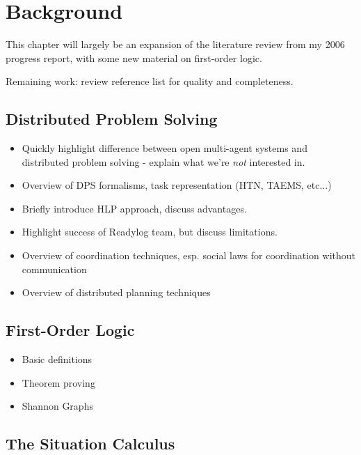 \chapter{Background}\label{ch:lit-review}

This chapter will largely be an expansion of the literature review from my 2006 progress report, with some new material on first-order logic.

Remaining work: review reference list for quality and completeness.

\section{Distributed Problem Solving}

\begin{itemize}
\item Quickly highlight difference between open multi-agent systems and
distributed problem solving - explain what we're \emph{not} interested in.
\item Overview of DPS formalisms, task representation (HTN, TAEMS, etc...)
\item Briefly introduce HLP approach, discuss advantages.
\item Highlight success of Readylog team, but discuss limitations.
\item Overview of coordination techniques, esp. social laws for coordination without communication
\item Overview of distributed planning techniques
\end{itemize}

\section{First-Order Logic}

\begin{itemize}
\item Basic definitions
\item Theorem proving
\item Shannon Graphs
\end{itemize}

\section{The Situation Calculus}

